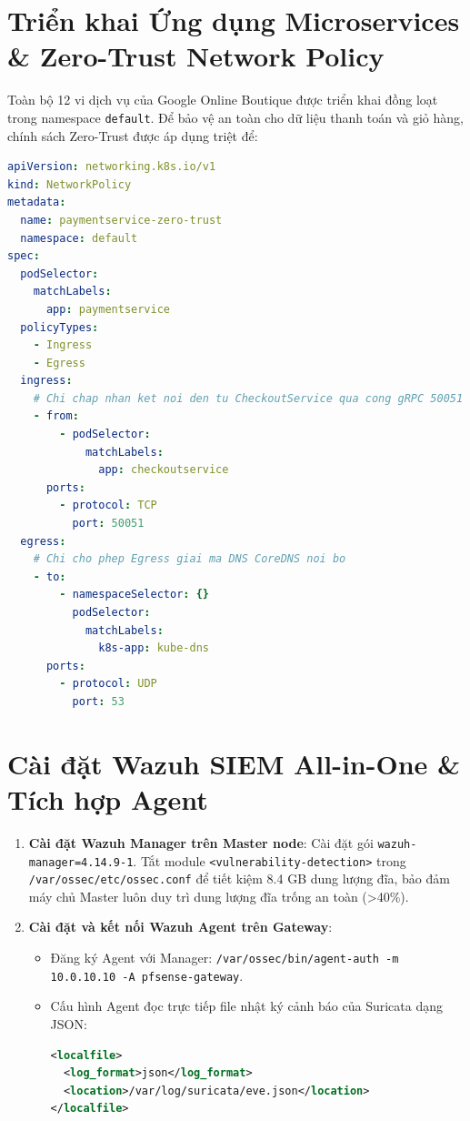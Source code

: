 \section{Triển khai Ứng dụng Microservices \& Zero-Trust Network Policy}
Toàn bộ 12 vi dịch vụ của Google Online Boutique được triển khai đồng loạt trong namespace \texttt{default}. Để bảo vệ an toàn cho dữ liệu thanh toán và giỏ hàng, chính sách Zero-Trust được áp dụng triệt để:

\begin{lstlisting}[language=yaml, caption={Chính sách NetworkPolicy Zero-Trust bảo vệ PaymentService}]
apiVersion: networking.k8s.io/v1
kind: NetworkPolicy
metadata:
  name: paymentservice-zero-trust
  namespace: default
spec:
  podSelector:
    matchLabels:
      app: paymentservice
  policyTypes:
    - Ingress
    - Egress
  ingress:
    # Chi chap nhan ket noi den tu CheckoutService qua cong gRPC 50051
    - from:
        - podSelector:
            matchLabels:
              app: checkoutservice
      ports:
        - protocol: TCP
          port: 50051
  egress:
    # Chi cho phep Egress giai ma DNS CoreDNS noi bo
    - to:
        - namespaceSelector: {}
          podSelector:
            matchLabels:
              k8s-app: kube-dns
      ports:
        - protocol: UDP
          port: 53
\end{lstlisting}

\section{Cài đặt Wazuh SIEM All-in-One \& Tích hợp Agent}
\begin{enumerate}
    \item \textbf{Cài đặt Wazuh Manager trên Master node}: Cài đặt gói \texttt{wazuh-manager=4.14.9-1}. Tắt module \texttt{<vulnerability-detection>} trong \texttt{/var/ossec/etc/ossec.conf} để tiết kiệm 8.4 GB dung lượng đĩa, bảo đảm máy chủ Master luôn duy trì dung lượng đĩa trống an toàn (>40\%).
    \item \textbf{Cài đặt và kết nối Wazuh Agent trên Gateway}:
    \begin{itemize}
        \item Đăng ký Agent với Manager: \texttt{/var/ossec/bin/agent-auth -m 10.0.10.10 -A pfsense-gateway}.
        \item Cấu hình Agent đọc trực tiếp file nhật ký cảnh báo của Suricata dạng JSON:
        \begin{lstlisting}[language=xml]
<localfile>
  <log_format>json</log_format>
  <location>/var/log/suricata/eve.json</location>
</localfile>
        \end{lstlisting}
    \end{itemize}
\end{enumerate}

